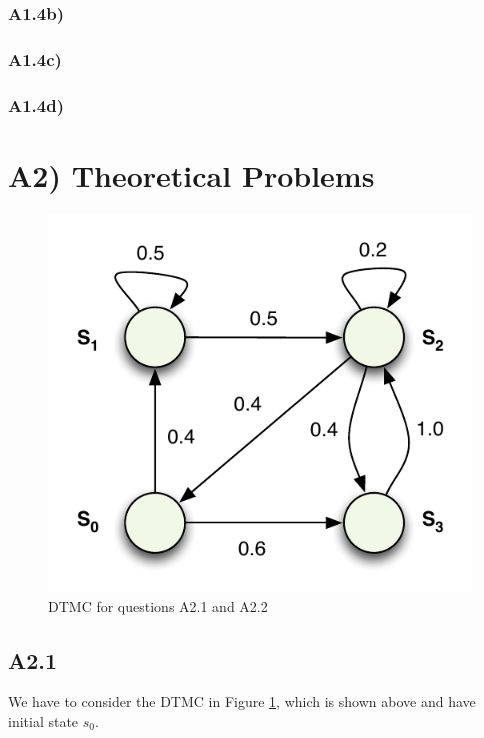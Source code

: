 \documentclass[12pt]{report}
\begin{document}
\subsubsection*{A1.4b)}


\subsubsection*{A1.4c)}


\subsubsection*{A1.4d)}


\section*{A2) Theoretical Problems}
\begin{figure}[H]
	\begin{center}
		\includegraphics[scale=.85]{../GFX/ExerciseFigure1.pdf}
	\end{center}
	\caption{DTMC for questions A2.1 and A2.2}
	\label{fig:2a12}
\end{figure}

\subsection*{A2.1}
We have to consider the DTMC in Figure \ref{fig:2a12}, which is shown above and have initial state $s_0$.
\end{document}
